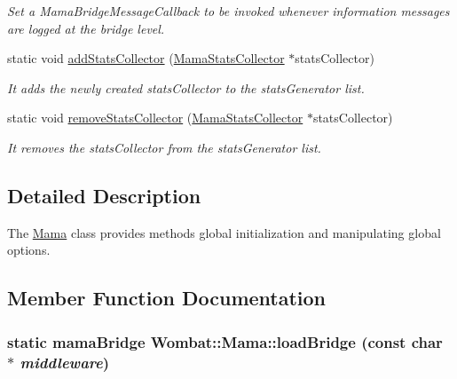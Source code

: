 \begin{DoxyCompactItemize}
\begin{DoxyCompactList}\small\item\em Set a MamaBridgeMessageCallback to be invoked whenever information messages are logged at the bridge level. \item\end{DoxyCompactList}\item 
static void \hyperlink{classWombat_1_1Mama_a0a49c8fa5e9b8af6378793d51be6d433}{addStatsCollector} (\hyperlink{classWombat_1_1MamaStatsCollector}{MamaStatsCollector} $\ast$statsCollector)
\begin{DoxyCompactList}\small\item\em It adds the newly created statsCollector to the statsGenerator list. \item\end{DoxyCompactList}\item 
static void \hyperlink{classWombat_1_1Mama_a146a3b3e2ee2490164a2b7659cbb712c}{removeStatsCollector} (\hyperlink{classWombat_1_1MamaStatsCollector}{MamaStatsCollector} $\ast$statsCollector)
\begin{DoxyCompactList}\small\item\em It removes the statsCollector from the statsGenerator list. \item\end{DoxyCompactList}\end{DoxyCompactItemize}


\subsection{Detailed Description}
The {\ttfamily \hyperlink{classWombat_1_1Mama}{Mama}} class provides methods global initialization and manipulating global options. 

\subsection{Member Function Documentation}
\hypertarget{classWombat_1_1Mama_a57bc9e0cf0931ccf84de55aaaf926f8d}{
\subsubsection[{loadBridge}]{\setlength{\rightskip}{0pt plus 5cm}static mamaBridge Wombat::Mama::loadBridge (const char $\ast$ {\em middleware})}}
\label{classWombat_1_1Mama_a57bc9e0cf0931ccf84de55aaaf926f8d}


